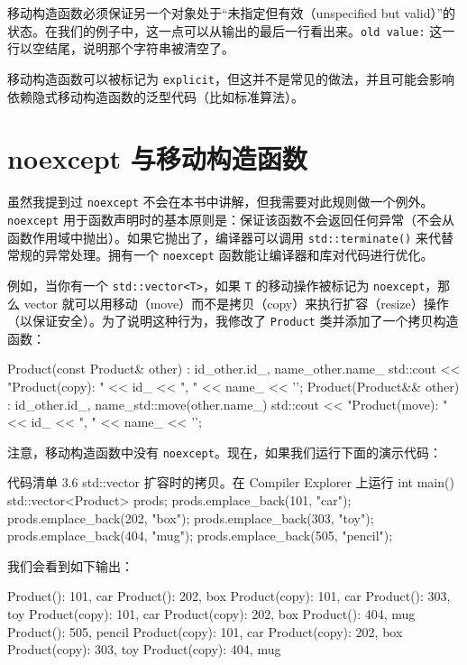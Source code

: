 移动构造函数必须保证另一个对象处于“未指定但有效（unspecified but valid）”的状态。在我们的例子中，这一点可以从输出的最后一行看出来。\texttt{old value:} 这一行以空结尾，说明那个字符串被清空了。

\begin{myInfoBox}
移动构造函数可以被标记为 \texttt{explicit}，但这并不是常见的做法，并且可能会影响依赖隐式移动构造函数的泛型代码（比如标准算法）。
\end{myInfoBox}

\section{noexcept 与移动构造函数}

虽然我提到过 \texttt{noexcept} 不会在本书中讲解，但我需要对此规则做一个例外。\texttt{noexcept} 用于函数声明时的基本原则是：保证该函数不会返回任何异常（不会从函数作用域中抛出）。如果它抛出了，编译器可以调用 \texttt{std::terminate()} 来代替常规的异常处理。拥有一个 \texttt{noexcept} 函数能让编译器和库对代码进行优化。

例如，当你有一个 \texttt{std::vector<T>}，如果 \texttt{T} 的移动操作被标记为 \texttt{noexcept}，那么 vector 就可以用移动（move）而不是拷贝（copy）来执行扩容（resize）操作（以保证安全）。为了说明这种行为，我修改了 \texttt{Product} 类并添加了一个拷贝构造函数：


\begin{codebox}[cpp]
Product(const Product& other) : id_{other.id_}, name_{other.name_} {
std::cout << "Product(copy): " << id_ << ", " << name_ << '\n';
}
Product(Product&& other) : id_{other.id_}, name_{std::move(other.name_)} {
std::cout << "Product(move): " << id_ << ", " << name_ << '\n';
}
\end{codebox}

注意，移动构造函数中没有 \texttt{noexcept}。现在，如果我们运行下面的演示代码：

\begin{codeboxt}[cpp]{代码清单 3.6 std::vector 扩容时的拷贝。在 Compiler Explorer 上运行}
int main() {
std::vector<Product> prods;
prods.emplace_back(101, "car");
prods.emplace_back(202, "box");
prods.emplace_back(303, "toy");
prods.emplace_back(404, "mug");
prods.emplace_back(505, "pencil");
}
\end{codeboxt}

我们会看到如下输出：

\begin{codebox}[cpp]
Product(): 101, car
Product(): 202, box
Product(copy): 101, car
Product(): 303, toy
Product(copy): 101, car
Product(copy): 202, box
Product(): 404, mug
Product(): 505, pencil
Product(copy): 101, car
Product(copy): 202, box
Product(copy): 303, toy
Product(copy): 404, mug
\end{codebox}

